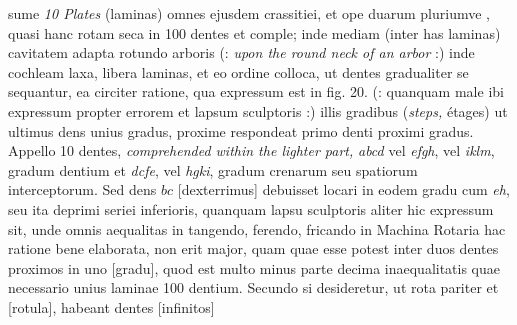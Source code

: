 sume \textit{10 Plates} (laminas) omnes ejusdem crassitiei, et ope duarum pluriumve , quasi  hanc rotam seca in 100 dentes et comple; inde mediam (inter has laminas) cavitatem adapta rotundo arboris (: \textit{upon the round neck of an arbor} :) inde cochleam laxa, libera laminas, et eo ordine colloca, ut dentes gradualiter se sequantur, ea circiter ratione, qua expressum est in fig. 20. (: quanquam male ibi expressum propter errorem et lapsum sculptoris :) illis gradibus (\textit{steps,} \'{e}tages) ut ultimus dens unius gradus, proxime respondeat primo denti proximi gradus. Appello 10 dentes, \textit{comprehended within the lighter part,} \textit{abcd} vel \textit{efgh}, vel \textit{iklm}, gradum dentium  et \textit{dcfe}, vel \textit{hgki}, gradum crenarum seu spatiorum  interceptorum. Sed dens $bc$ [dexterrimus] debuisset locari in eodem gradu cum \textit{eh}, seu ita deprimi  seriei inferioris, quanquam lapsu sculptoris aliter hic expressum sit, unde omnis aequalitas in tangendo, ferendo, fricando in Machina Rotaria hac ratione bene elaborata, non erit major, quam quae esse potest inter duos dentes proximos in uno [gradu], quod est multo minus parte decima inaequalitatis quae necessario  unius laminae 100 dentium.
\pend
\newpage
\pstart \noindent Secundo si desideretur, ut rota pariter et [rotula], habeant dentes [infinitos]
